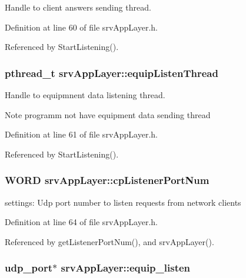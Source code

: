 Handle to client answers sending thread. 



Definition at line 60 of file srvAppLayer.h.



Referenced by StartListening().

\hypertarget{classsrvAppLayer_ae0a4157df420f09cc38a0f51e5b18419}{
\subsubsection[{equipListenThread}]{\setlength{\rightskip}{0pt plus 5cm}pthread\_\-t {\bf srvAppLayer::equipListenThread}}}
\label{d8/d72/classsrvAppLayer_ae0a4157df420f09cc38a0f51e5b18419}


Handle to equipmnent data listening thread. 

\begin{DoxyNote}{Note}
programm not have equipment data sending thread 
\end{DoxyNote}


Definition at line 61 of file srvAppLayer.h.



Referenced by StartListening().

\hypertarget{classsrvAppLayer_a48dd164d86d1e43d4bd6e775f75986f1}{
\subsubsection[{cpListenerPortNum}]{\setlength{\rightskip}{0pt plus 5cm}WORD {\bf srvAppLayer::cpListenerPortNum}}}
\label{d8/d72/classsrvAppLayer_a48dd164d86d1e43d4bd6e775f75986f1}


settings: Udp port number to listen requests from network clients 



Definition at line 64 of file srvAppLayer.h.



Referenced by getListenerPortNum(), and srvAppLayer().

\hypertarget{classsrvAppLayer_af96e38bd128f37b4facc0957c31ae6ac}{
\subsubsection[{equip\_\-listen}]{\setlength{\rightskip}{0pt plus 5cm}udp\_\-port$\ast$ {\bf srvAppLayer::equip\_\-listen}}}
\label{d8/d72/classsrvAppLayer_af96e38bd128f37b4facc0957c31ae6ac}


